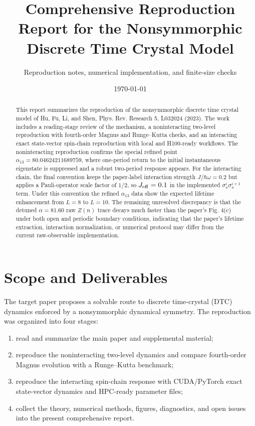 \documentclass[aps,pra,preprint,superscriptaddress,nofootinbib]{revtex4-2}
\begin{document}
\title{Comprehensive Reproduction Report for the Nonsymmorphic Discrete Time Crystal Model}
\author{Reproduction notes, numerical implementation, and finite-size checks}
\date{\today}

\begin{abstract}
This report summarizes the reproduction of the nonsymmorphic discrete time crystal model of Hu, Fu, Li, and Shen, Phys. Rev. Research 5, L032024 (2023). The work includes a reading-stage review of the mechanism, a noninteracting two-level reproduction with fourth-order Magnus and Runge--Kutta checks, and an interacting exact state-vector spin-chain reproduction with local and H100-ready workflows. The noninteracting reproduction confirms the special refined point \(\alpha_{13}=80.04624211689759\), where one-period return to the initial instantaneous eigenstate is suppressed and a robust two-period response appears. For the interacting chain, the final convention keeps the paper-label interaction strength \(J/\hbar\omega=0.2\) but applies a Pauli-operator scale factor of \(1/2\), so \(J_{\rm eff}=0.1\) in the implemented \(\sigma_x^i\sigma_x^{i+1}\) term. Under this convention the refined \(\alpha_{13}\) data show the expected lifetime enhancement from \(L=8\) to \(L=10\). The remaining unresolved discrepancy is that the detuned \(\alpha=81.60\) raw \(Z(n)\) trace decays much faster than the paper's Fig. 4(c) under both open and periodic boundary conditions, indicating that the paper's lifetime extraction, interaction normalization, or numerical protocol may differ from the current raw-observable implementation.
\end{abstract}

\maketitle

\section{Scope and Deliverables}

The target paper proposes a solvable route to discrete time-crystal (DTC) dynamics enforced by a nonsymmorphic dynamical symmetry. The reproduction was organized into four stages:
\begin{enumerate}
\item read and summarize the main paper and supplemental material;
\item reproduce the noninteracting two-level dynamics and compare fourth-order Magnus evolution with a Runge--Kutta benchmark;
\item reproduce the interacting spin-chain response with CUDA/PyTorch exact state-vector dynamics and HPC-ready parameter files;
\item collect the theory, numerical methods, figures, diagnostics, and open issues into the present comprehensive report.
\end{enumerate}
\end{document}
